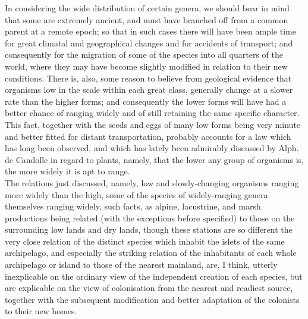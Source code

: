 \indent In considering the wide distribution of certain genera, we should bear in mind that some are extremely ancient, and must have branched off from a common parent at a remote epoch; so that in such cases there will have been ample time for great climatal and geographical changes and for accidents of transport; and consequently for the migration of some of the species into all quarters of the world, where they may have become slightly modified in relation to their new conditions. There is, also, some reason to believe from geological evidence that organisms low in the scale within each great class, generally change at a slower rate than the higher forms; and consequently the lower forms will have had a better chance of ranging widely and of still retaining the same specific character. This fact, together with the seeds and eggs of many low forms being very minute and better fitted for distant transportation, probably accounts for a law which has long been observed, and which has lately been admirably discussed by Alph. de Candolle in regard to plants, namely, that the lower any group of organisms is, the more widely it is apt to range.~\\
\indent The relations just discussed, namely, low and slowly-changing organisms ranging more widely than the high, some of the species of widely-ranging genera themselves ranging widely, such facts, as alpine, lacustrine, and marsh productions being related (with the exceptions before specified) to those on the surrounding low lands and dry lands, though these stations are so different the very close relation of the distinct species which inhabit the islets of the same archipelago, and especially the striking relation of the inhabitants of each whole archipelago or island to those of the nearest mainland, are, I think, utterly inexplicable on the ordinary view of the independent creation of each species, but are explicable on the view of colonisation from the nearest and readiest source, together with the subsequent modification and better adaptation of the colonists to their new homes.~\\

